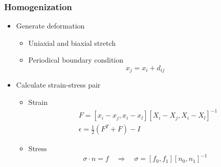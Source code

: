 \documentclass[serif,mathserif, 12pt]{beamer}
\begin{document}
\begin{frame}
  \frametitle{Homogenization}
  \begin{itemize}
  \item Generate deformation
    \begin{itemize}
    \item<1->[-] Uniaxial and biaxial stretch
    \item<2->[-] Periodical boundary condition
      \[x_j = x_i+d_{ij}\]
    \end{itemize}
  \item<3-> Calculate strain-stress pair
    \begin{itemize}
    \item<3->[-] Strain
      \[
      \begin{split}
        &F = [x_i-x_j, x_i-x_l][X_i-X_j, X_i-X_l]^{-1} \\
        &\epsilon = \frac{1}{2}(F^T+F)-I
      \end{split}
      \]
    \item<4->[-] Stress
      \[
      \sigma \cdot n = f \quad \Rightarrow \quad \sigma = [f_0, f_1][n_0, n_1]^{-1}
      \]
    \end{itemize}
  \end{itemize}
\end{frame}
\end{document}
